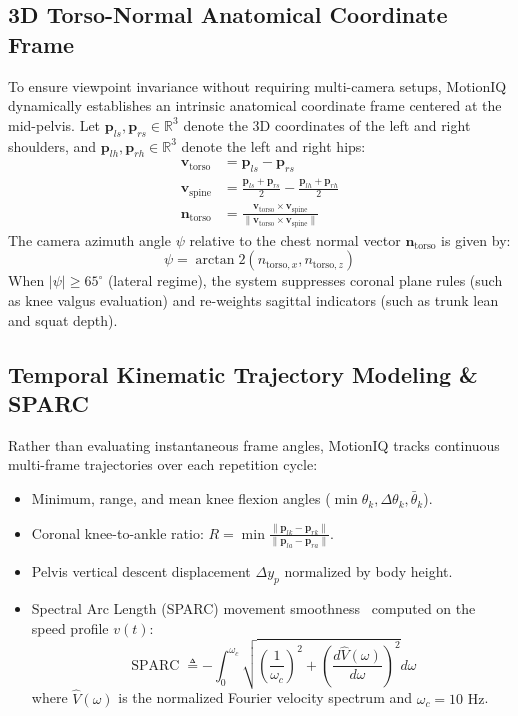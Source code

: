 \documentclass[10pt,journal,compsoc]{IEEEtran}
\begin{document}
\subsection{3D Torso-Normal Anatomical Coordinate Frame}
To ensure viewpoint invariance without requiring multi-camera setups, MotionIQ dynamically establishes an intrinsic anatomical coordinate frame centered at the mid-pelvis. Let $\mathbf{p}_{ls}, \mathbf{p}_{rs} \in \mathbb{R}^3$ denote the 3D coordinates of the left and right shoulders, and $\mathbf{p}_{lh}, \mathbf{p}_{rh} \in \mathbb{R}^3$ denote the left and right hips:
\begin{align}
\mathbf{v}_{\text{torso}} &= \mathbf{p}_{ls} - \mathbf{p}_{rs} \\
\mathbf{v}_{\text{spine}} &= \frac{\mathbf{p}_{ls} + \mathbf{p}_{rs}}{2} - \frac{\mathbf{p}_{lh} + \mathbf{p}_{rh}}{2} \\
\mathbf{n}_{\text{torso}} &= \frac{\mathbf{v}_{\text{torso}} \times \mathbf{v}_{\text{spine}}}{\|\mathbf{v}_{\text{torso}} \times \mathbf{v}_{\text{spine}}\|}
\end{align}
The camera azimuth angle $\psi$ relative to the chest normal vector $\mathbf{n}_{\text{torso}}$ is given by:
\begin{equation}
\psi = \arctan2\left(n_{\text{torso}, x}, n_{\text{torso}, z}\right)
\end{equation}
When $|\psi| \ge 65^\circ$ (lateral regime), the system suppresses coronal plane rules (such as knee valgus evaluation) and re-weights sagittal indicators (such as trunk lean and squat depth).

\subsection{Temporal Kinematic Trajectory Modeling \& SPARC}
Rather than evaluating instantaneous frame angles, MotionIQ tracks continuous multi-frame trajectories over each repetition cycle:
\begin{itemize}
    \item Minimum, range, and mean knee flexion angles ($\min \theta_k, \Delta \theta_k, \bar{\theta}_k$).
    \item Coronal knee-to-ankle ratio: $R = \min \frac{\|\mathbf{p}_{lk} - \mathbf{p}_{rk}\|}{\|\mathbf{p}_{la} - \mathbf{p}_{ra}\|}$.
    \item Pelvis vertical descent displacement $\Delta y_p$ normalized by body height.
    \item Spectral Arc Length (SPARC) movement smoothness~\cite{balasubramanian2015quantifying} computed on the speed profile $v(t)$:
    \begin{equation}
    \operatorname{SPARC} \triangleq -\int_0^{\omega_c} \sqrt{\left(\frac{1}{\omega_c}\right)^2 + \left(\frac{d\hat{V}(\omega)}{d\omega}\right)^2} d\omega
    \end{equation}
    where $\hat{V}(\omega)$ is the normalized Fourier velocity spectrum and $\omega_c = 10\text{ Hz}$.
\end{itemize}
\end{document}
